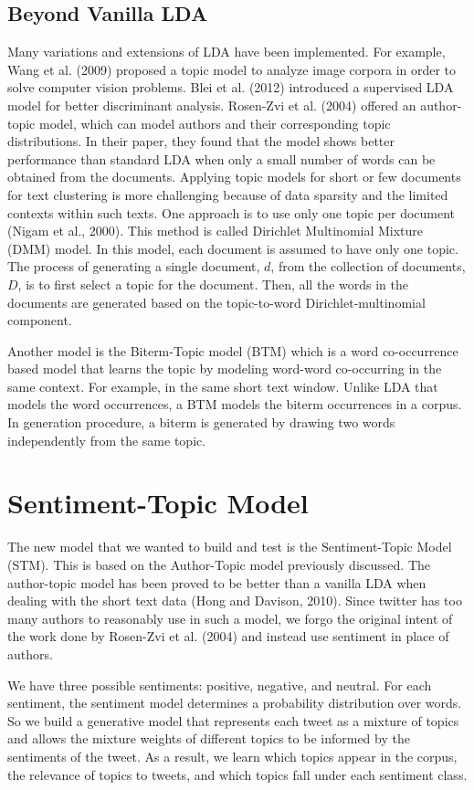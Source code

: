 \documentclass[12pt]{amsart}
\newcommand{\0}{\mat{0}}
\newcommand{\1}{\mathds{1}}
\begin{document}
\subsection{Beyond Vanilla LDA}
Many variations and extensions of LDA have been implemented. For example, Wang et al. (2009) proposed a topic model to analyze image corpora in order to solve computer vision problems. Blei et al. (2012) introduced a supervised LDA model for better discriminant analysis. Rosen-Zvi et al. (2004) offered an author-topic model, which can model authors and their corresponding topic distributions. In their paper, they found that the model shows better performance than standard LDA when only a small number of words can be obtained from the documents. Applying topic models for short or few documents for text clustering is more challenging because of data sparsity and the limited contexts within such texts. One approach is to use only one topic per document (Nigam et al., 2000). This method is called Dirichlet Multinomial Mixture (DMM) model. In this model, each document is assumed to have only one topic. The process of generating a single document, $d$, from the collection of documents, $D$, is to first select a topic for the document. Then, all the words in the documents are generated based on the topic-to-word Dirichlet-multinomial component.

Another model is the Biterm-Topic model (BTM) which is a word co-occurrence based  model that learns the topic by modeling word-word co-occurring in the same context. For example, in the same short text window. Unlike LDA that models the word occurrences, a BTM models the biterm occurrences in a corpus. In generation procedure, a biterm is generated by drawing two words independently from the same topic.

\section{Sentiment-Topic Model}

The new model that we wanted to build and test is the Sentiment-Topic Model (STM). This is based on the Author-Topic model previously discussed. The author-topic model has been proved to be better than a vanilla LDA when dealing with the short text data (Hong and Davison, 2010). Since twitter has too many authors to reasonably use in such a model, we forgo the original intent of the work done by Rosen-Zvi et al. (2004) and instead use sentiment in place of authors. 

We have three possible sentiments: positive, negative, and neutral. For each sentiment, the sentiment model determines a probability distribution over words. So we build a generative model that represents each tweet as a mixture of topics and allows the mixture weights of different topics to be informed by the sentiments of the tweet. As a result, we learn which topics appear in the corpus, the relevance of topics to tweets, and which topics fall under each sentiment class.
\end{document}
